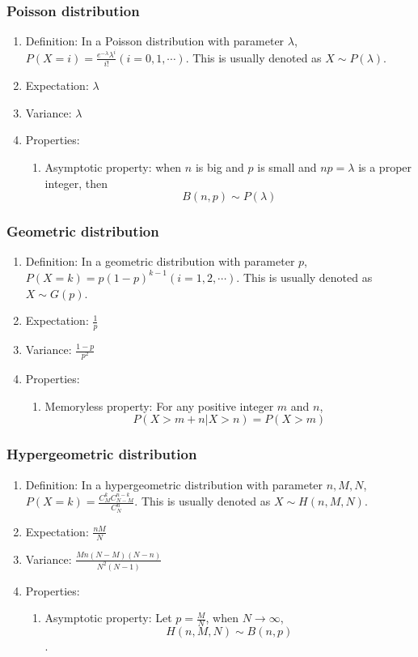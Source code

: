\documentclass[a4paper]{article}
\begin{document}
	\subsubsection{Poisson distribution}
		\begin{enumerate}
		\item Definition: In a Poisson distribution with parameter $\lambda$, $P(X=i)=\frac{e^{-\lambda}\lambda^i}{i!}(i=0, 1, \cdots)$. This is usually denoted as $X\sim P(\lambda)$.
		\item Expectation: $\lambda$
		\item Variance: $\lambda$
		\item Properties:
			\begin{enumerate}
			\item Asymptotic property: when $n$ is big and $p$ is small and $np=\lambda$ is a proper integer, then $$B(n,p)\sim P(\lambda)$$
			\end{enumerate}
		\end{enumerate}
	\subsubsection{Geometric distribution}
		\begin{enumerate}
		\item Definition: In a geometric distribution with parameter $p$, $P(X=k)=p(1-p)^{k-1}(i=1, 2, \cdots)$. This is usually denoted as $X\sim G(p)$.
		\item Expectation: $\frac{1}{p}$
		\item Variance: $\frac{1-p}{p^2}$
		\item Properties:
			\begin{enumerate}
			\item Memoryless property: For any positive integer $m$ and $n$,
$$P(X>m+n|X>n)=P(X>m)$$
			\end{enumerate}
		\end{enumerate}
	\subsubsection{Hypergeometric distribution}
		\begin{enumerate}
		\item Definition: In a hypergeometric distribution with parameter $n,M,N$, $P(X=k)=\frac{C_M^kC_{N-M}^{n-k}}{C_N^n}$. This is usually denoted as $X\sim H(n,M,N)$.
		\item Expectation: $\frac{nM}{N}$
		\item Variance: $\frac{Mn(N-M)(N-n)}{N^2(N-1)}$
		\item Properties:
			\begin{enumerate}
			\item Asymptotic property: Let $p=\frac{M}{N}$, when $N\rightarrow\infty$, 
$$H(n,M,N)\sim B(n,p)$$.
			\end{enumerate}
		\end{enumerate}
\end{document}
